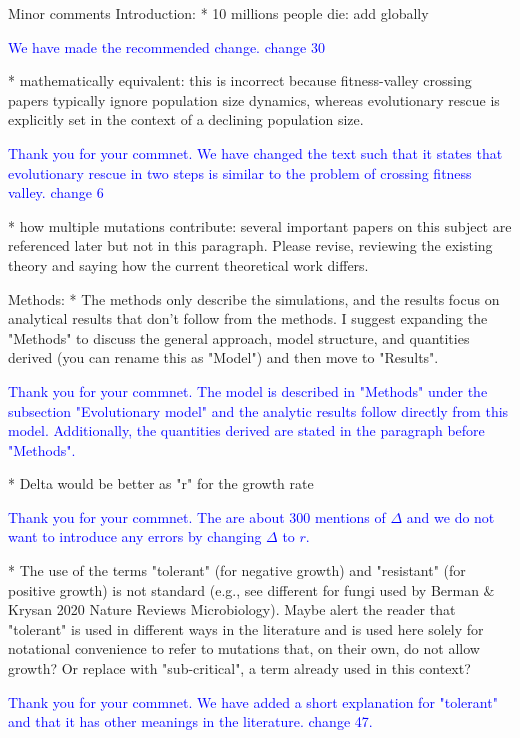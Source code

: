 \documentclass[12pt]{extarticle}
\begin{document}
Minor comments
Introduction:
* 10 millions people die: add globally

\textcolor{blue}{We have made the recommended change. change 30} 

* mathematically equivalent: this is incorrect because fitness-valley crossing papers typically ignore population size dynamics, whereas evolutionary rescue is explicitly set in the context of a declining population size.

\textcolor{blue}{Thank you for your commnet. We have changed the text such that it states that evolutionary rescue in two steps is similar to the problem of crossing fitness valley. change 6} 

* how multiple mutations contribute: several important papers on this subject are referenced later but not in this paragraph. Please revise, reviewing the existing theory and saying how the current theoretical work differs.

Methods:
* The methods only describe the simulations, and the results focus on analytical results that don't follow from the methods. I suggest expanding the "Methods" to discuss the general approach, model structure, and quantities derived (you can rename this as "Model") and then move to "Results".

\textcolor{blue}{Thank you for your commnet. The model is described in "Methods" under the subsection "Evolutionary model" and the analytic results follow directly from this model. Additionally, the quantities derived are stated in the paragraph before "Methods". } 

* Delta would be better as "r" for the growth rate

\textcolor{blue}{Thank you for your commnet. The are about 300 mentions of $\Delta$ and we do not want to introduce any errors by changing $\Delta$ to $r$.}

* The use of the terms "tolerant" (for negative growth) and "resistant" (for positive growth) is not standard (e.g., see different for fungi used by Berman $\&$ Krysan 2020 Nature Reviews Microbiology). Maybe alert the reader that "tolerant" is used in different ways in the literature and is used here solely for notational convenience to refer to mutations that, on their own, do not allow growth? Or replace with "sub-critical", a term already used in this context?

\textcolor{blue}{Thank you for your commnet. We have added a short explanation for "tolerant" and that it has other meanings in the literature. change 47.}
\end{document}
